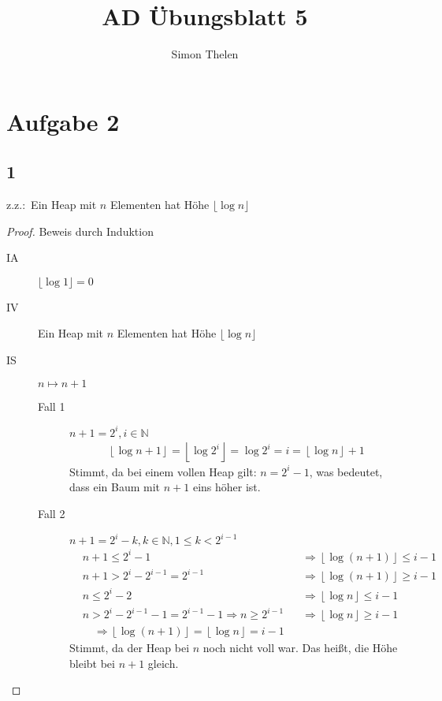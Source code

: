 \documentclass[a4paper]{article}
\title{AD Übungsblatt 5}
\author{Simon Thelen}
\newcommand{\floor}[1]{\left\lfloor{}{#1}\right\rfloor}
\begin{document}
    \maketitle

    \section*{Aufgabe 2}
    \label{sec:aufgabe2}

    \subsection*{1}
    \label{subsec:aufgabe2_1}
    z.z.:\  Ein Heap mit $n$ Elementen hat Höhe $\lfloor\log{n}\rfloor$
    \begin{proof}
        Beweis durch Induktion

        \begin{description}
            \item[IA] $\lfloor\log{1}\rfloor = 0$
            \item[IV] Ein Heap mit $n$ Elementen hat Höhe $\lfloor\log{n}\rfloor$
            \item[IS] $n \longmapsto n + 1$
            \begin{description}
                \item[Fall 1] $n + 1 = 2^i, i \in \mathbb{N}$
                \begin{gather*}
                    \floor{\log{n + 1}} = \floor{\log{2^i}} = \log{2^i} = i = \floor{\log{n}} + 1
                \end{gather*}
                Stimmt, da bei einem vollen Heap gilt: $n = 2^i - 1$, was bedeutet, dass ein Baum mit $n + 1$ eins höher ist.
                \item[Fall 2] $n + 1 = 2^i - k, k \in \mathbb{N}, 1 \leq k < 2^{i - 1}$
                \begin{align*}
                    &n + 1 \leq 2^i - 1 &&\Rightarrow \floor{\log{(n + 1)}} \leq i - 1 \\
                    &n + 1 > 2^i - 2^{i - 1} = 2^{i - 1} &&\Rightarrow \floor{\log{(n + 1)}} \geq i - 1 \\
                    &n \leq 2^i - 2 &&\Rightarrow \floor{\log{n}} \leq i - 1 \\
                    &n > 2^i - 2^{i - 1} - 1 = 2^{i - 1} - 1 \Rightarrow n \geq 2^{i - 1} &&\Rightarrow \floor{\log{n}} \geq i - 1 \\
                    &\quad\Rightarrow \floor{\log{(n + 1)}} = \floor{\log{n}} = i - 1
                \end{align*}
                Stimmt, da der Heap bei $n$ noch nicht voll war. Das heißt, die Höhe bleibt bei $n + 1$ gleich.
            \end{description}
        \end{description}
    \end{proof}
\end{document}
